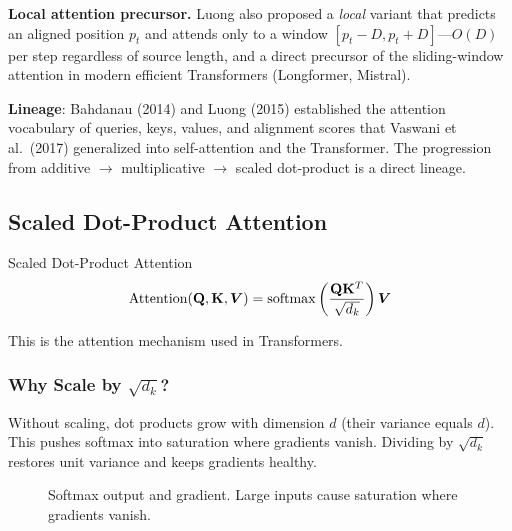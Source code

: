 \textbf{Local attention precursor.} Luong also proposed a \emph{local} variant that predicts an aligned position $p_t$ and attends only to a window $[p_t - D, p_t + D]$---$O(D)$ per step regardless of source length, and a direct precursor of the sliding-window attention in modern efficient Transformers (Longformer, Mistral).

\textbf{Lineage}: Bahdanau (2014) and Luong (2015) established the attention vocabulary of queries, keys, values, and alignment scores that Vaswani et al.\ (2017) generalized into self-attention and the Transformer. The progression from additive $\to$ multiplicative $\to$ scaled dot-product is a direct lineage.

\subsection{Scaled Dot-Product Attention}

\begin{mathresult}{Scaled Dot-Product Attention}
\begin{equation}
\text{Attention}(\mathbf{Q}, \mathbf{K}, \bm{V}) = \operatorname{softmax}\left(\frac{\mathbf{Q}\mathbf{K}^T}{\sqrt{d_k}}\right)\bm{V}
\end{equation}
\end{mathresult}

This is the attention mechanism used in Transformers.

\subsubsection{Why Scale by $\sqrt{d_k}$?}

Without scaling, dot products grow with dimension $d$ (their variance equals $d$). This pushes softmax into saturation where gradients vanish. Dividing by $\sqrt{d_k}$ restores unit variance and keeps gradients healthy.

\begin{figure}[H]
\centering
{}
\caption{Softmax output and gradient. Large inputs cause saturation where gradients vanish.}
\label{fig:softmax_saturation}
\end{figure}

